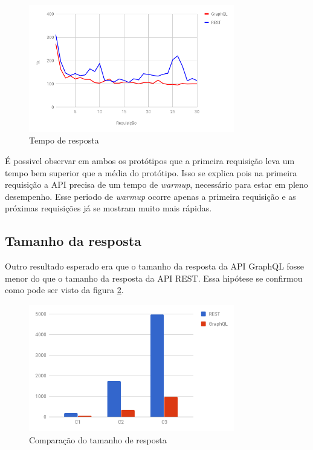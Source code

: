 \begin{figure}[htbp]
    \centering
    \includegraphics[width=0.8\textwidth]{figuras/q1-time-line.png}
    \caption{Tempo de resposta}
    \label{fig:q1-time-line}
    \author{fonte: Autor}
\end{figure}

É possivel observar em ambos os protótipos que a primeira requisição leva um tempo bem superior que a média do protótipo. Isso se explica pois na primeira requisição a API precisa de um tempo de \textit{warmup}, necessário para estar em pleno desempenho. Esse periodo de \textit{warmup} ocorre apenas a primeira requisição e as próximas requisições já se mostram muito mais rápidas.

\subsection{Tamanho da resposta}

Outro resultado esperado era que o tamanho da resposta da API GraphQL fosse menor do que o tamanho da resposta da API REST. Essa hipótese se confirmou como pode ser visto da figura \ref{fig:q1-size}.

\begin{figure}[htbp]
    \centering
    \includegraphics[width=0.8\textwidth]{figuras/q1-size.png}
    \caption{Comparação do tamanho de resposta}
    \label{fig:q1-size}
    \author{fonte: Autor}
\end{figure}

